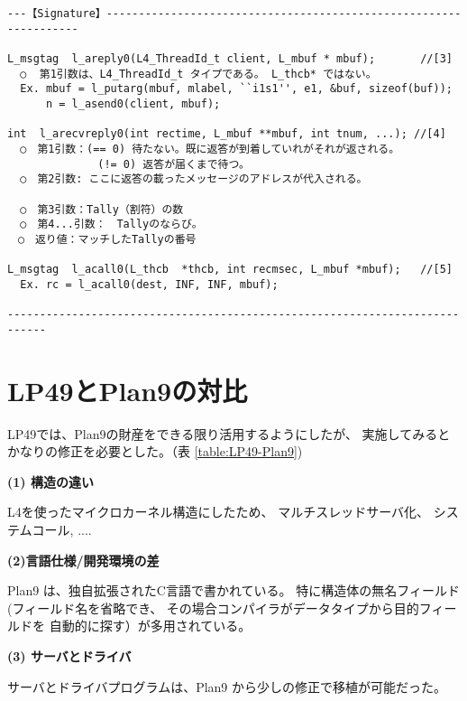 \documentclass{jarticle}
\begin{document}
\begin{verbatim}
---【Signature】------------------------------------------------------------------

L_msgtag  l_areply0(L4_ThreadId_t client, L_mbuf * mbuf);       //[3]
  ○  第1引数は、L4_ThreadId_t タイプである。 L_thcb* ではない。
  Ex. mbuf = l_putarg(mbuf, mlabel, ``i1s1'', e1, &buf, sizeof(buf));
      n = l_asend0(client, mbuf);

int  l_arecvreply0(int rectime, L_mbuf **mbuf, int tnum, ...); //[4]
  ○　第1引数：(== 0) 待たない。既に返答が到着していれがそれが返される。
              (!= 0) 返答が届くまで待つ。
  ○　第2引数: ここに返答の載ったメッセージのアドレスが代入される。
  
  ○　第3引数：Tally（割符）の数
  ○　第4...引数：　Tallyのならび。
　○　返り値：マッチしたTallyの番号

L_msgtag  l_acall0(L_thcb  *thcb, int recmsec, L_mbuf *mbuf);   //[5]
  Ex. rc = l_acall0(dest, INF, INF, mbuf);

----------------------------------------------------------------------------
\end{verbatim}








\section{LP49とPlan9の対比 }

LP49では、Plan9の財産をできる限り活用するようにしたが、
実施してみるとかなりの修正を必要とした。（表 \ref{table:LP49-Plan9})

{\bf (1) 構造の違い}

L4を使ったマイクロカーネル構造にしたため、
マルチスレッドサーバ化、
システムコール,
....

{\bf (2)言語仕様/開発環境の差}

Plan9 は、独自拡張されたC言語で書かれている。
特に構造体の無名フィールド (フィールド名を省略でき、
その場合コンパイラがデータタイプから目的フィールドを
自動的に探す）が多用されている。


{\bf (3) サーバとドライバ}

サーバとドライバプログラムは、Plan9 から少しの修正で移植が可能だった。
\end{document}
